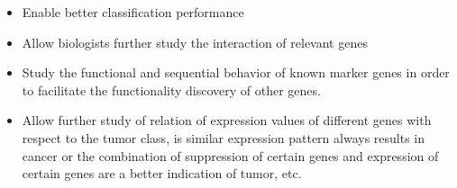 \begin{itemize}[noitemsep]
    \item Enable better classification performance
    \item Allow biologists further study the interaction of relevant genes 
    \item Study the functional and sequential behavior of known marker genes in order to facilitate the functionality discovery of other genes.
    \item Allow further study of relation of expression values of different genes with respect to the tumor class, is similar expression pattern always results in cancer or the combination of suppression of certain genes and expression of certain genes are a better indication of tumor, etc.
\end{itemize}


